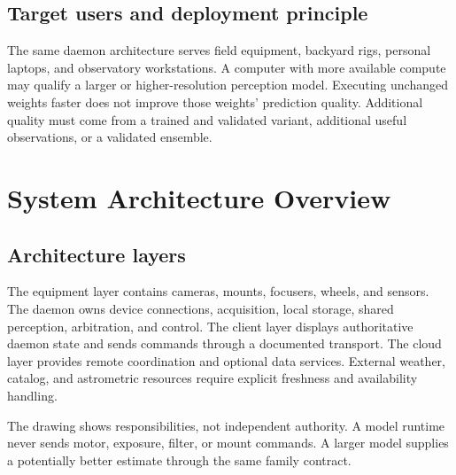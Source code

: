 \documentclass[11pt,a4paper]{article}
\begin{document}
\subsection{Target users and deployment principle}
The same daemon architecture serves field equipment, backyard rigs, personal
laptops, and observatory workstations. A computer with more available compute
may qualify a larger or higher-resolution perception model. Executing unchanged
weights faster does not improve those weights' prediction quality. Additional
quality must come from a trained and validated variant, additional useful
observations, or a validated ensemble.

\section{System Architecture Overview}
\label{sec:architecture}
\subsection{Architecture layers}
The equipment layer contains cameras, mounts, focusers, wheels, and sensors.
The daemon owns device connections, acquisition, local storage, shared
perception, arbitration, and control. The client layer displays authoritative
daemon state and sends commands through a documented transport. The cloud
layer provides remote coordination and optional data services. External weather,
catalog, and astrometric resources require explicit freshness and availability
handling.

\begin{center}
\end{center}
The drawing shows responsibilities, not independent authority. A model runtime
never sends motor, exposure, filter, or mount commands. A larger model supplies
a potentially better estimate through the same family contract.
\end{document}

